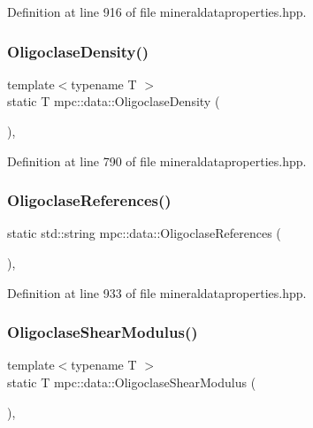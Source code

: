 Definition at line 916 of file mineraldataproperties.\+hpp.

\mbox{\label{namespacempc_1_1data_a7f28bb1bdc093d48e2638d4246104135}} 
\subsubsection{\texorpdfstring{Oligoclase\+Density()}{OligoclaseDensity()}}
{\footnotesize\ttfamily template$<$typename T $>$ \\
static T mpc\+::data\+::\+Oligoclase\+Density (\begin{DoxyParamCaption}{ }\end{DoxyParamCaption})\hspace{0.3cm}{\ttfamily [inline]}, {\ttfamily [static]}}



Definition at line 790 of file mineraldataproperties.\+hpp.

\mbox{\label{namespacempc_1_1data_a353459079b0c82e2fcf4d61f13c4d595}} 
\subsubsection{\texorpdfstring{Oligoclase\+References()}{OligoclaseReferences()}}
{\footnotesize\ttfamily static std\+::string mpc\+::data\+::\+Oligoclase\+References (\begin{DoxyParamCaption}{ }\end{DoxyParamCaption})\hspace{0.3cm}{\ttfamily [inline]}, {\ttfamily [static]}}



Definition at line 933 of file mineraldataproperties.\+hpp.

\mbox{\label{namespacempc_1_1data_a8cc34873fd27a627bc779da67e8ab6ce}} 
\subsubsection{\texorpdfstring{Oligoclase\+Shear\+Modulus()}{OligoclaseShearModulus()}}
{\footnotesize\ttfamily template$<$typename T $>$ \\
static T mpc\+::data\+::\+Oligoclase\+Shear\+Modulus (\begin{DoxyParamCaption}{ }\end{DoxyParamCaption})\hspace{0.3cm}{\ttfamily [inline]}, {\ttfamily [static]}}



